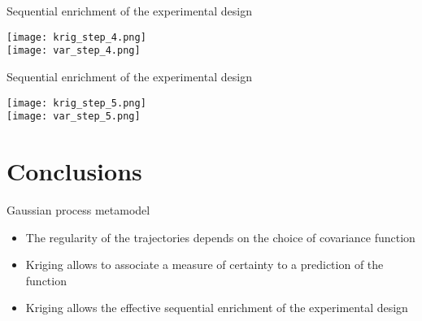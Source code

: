 \documentclass[9pt]{beamer}
\begin{document}

\begin{frame}{Sequential enrichment of the experimental design}

\begin{center}
\texttt{[image: krig\_step\_4.png]}\\
\texttt{[image: var\_step\_4.png]}
\end{center}

\end{frame}


\begin{frame}{Sequential enrichment of the experimental design}

\begin{center}
\texttt{[image: krig\_step\_5.png]}\\
\texttt{[image: var\_step\_5.png]}
\end{center}

\end{frame}

\section{Conclusions}

\begin{frame}{Gaussian process metamodel }

\begin{itemize}
\item The regularity of the trajectories depends on the choice of covariance function
\vspace{0.6cm}
\item Kriging allows to associate a measure of certainty to a prediction of the function
\vspace{0.6cm}
\item Kriging allows the effective sequential enrichment of the experimental design
\end{itemize}

\end{frame}

\footnotesize


\begin{frame}[plain]
		\vskip-3ex
\begin{columns}[t]
	\begin{column}{5.5cm}
  \begin{center}
  \textcolor{orange}{\Huge Thank you}
  \end{center}
  	\end{column}
	\begin{column}{3.2cm}
	  	\end{column}
	  	\end{columns}
\end{frame}
\end{document}

